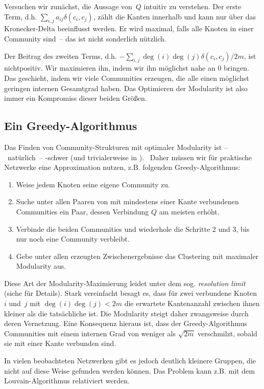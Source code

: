 Versuchen wir zunächst, die Aussage von~$Q$ intuitiv zu verstehen.
Der erste Term, d.h. $\sum_{i,j} a_{ij} \delta(c_i, c_j)$, zählt die Kanten innerhalb und kann nur über das Kronecker-Delta beeinflusst werden.
Er wird maximal, falls alle Knoten in einer Community sind~-- das ist nicht sonderlich nützlich.

Der Beitrag des zweiten Terms, d.h. $-\sum_{i,j} \deg(i)\deg(j) \delta(c_i, c_j)/2m$, ist nichtpositiv.
Wir maximieren ihn, indem wir ihn möglichst nahe an $0$ bringen.
Das geschieht, indem wir viele Communities erzeugen, die alle einen möglichst geringen internen Gesamtgrad haben.
Das Optimieren der Modularity ist also immer ein Kompromiss dieser beiden Größen.

\subsection{Ein Greedy-Algorithmus}
Das Finden von Community-Strukturen mit optimaler Modularity ist --~natürlich~-- \NP-schwer (und trivialerweise in \NP).~\cite{DBLP:journals/tkde/BrandesDGGHNW08}
Daher müssen wir für praktische Netzwerke eine Approximation nutzen, z.B. folgenden Greedy-Algorithmus:

\begin{enumerate}
    \item Weise jedem Knoten seine eigene Community zu.
    \item Suche unter allen Paaren von mit mindestens einer Kante verbundenen Communities ein Paar, dessen Verbindung $Q$ am meisten erhöht.
    \item Verbinde die beiden Communities und wiederhole die Schritte 2 und 3, bis nur noch eine Community verbleibt.
    \item Gebe unter allen erzeugten Zwischenergebnisse das Clustering mit maximaler Modularity aus.
\end{enumerate}

Diese Art der Modularity-Maximierung leidet unter dem sog. \emph{resolution limit} (siehe \cite{barabasi2014network} für Details).
Stark vereinfacht besagt es, dass für zwei verbundene Knoten $i$ und~$j$ mit $\deg(i) \deg(j) < 2m$ die erwartete Kantenanzahl zwischen ihnen kleiner als die tatsächliche ist.
Die Modularity steigt daher zwangsweise durch deren Vernetzung.
Eine Konsequenz hieraus ist, dass der Greedy-Algorithmus Communities mit einem internen Grad von weniger als $\sqrt{2m}$ verschmilzt, sobald sie mit einer Kante verbunden sind.

In vielen beobachteten Netzwerken gibt es jedoch deutlich kleinere Gruppen, die nicht auf diese Weise gefunden werden können.
Das Problem kann z.B. mit dem Louvain-Algorithmus relativiert werden.
